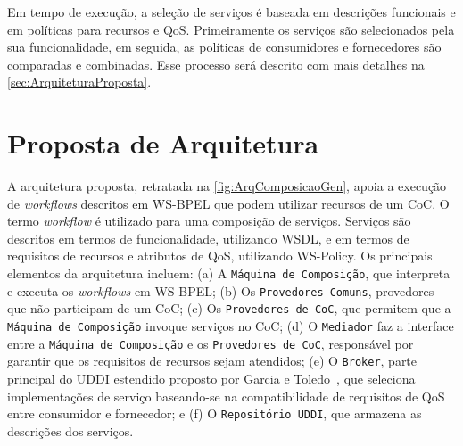 \documentclass[12pt]{report} %
\begin{document}
	
 	    

	Em tempo de execução, a seleção de serviços é baseada em descrições funcionais e em políticas para recursos e QoS.
	Primeiramente os serviços são selecionados pela sua funcionalidade, em seguida, as políticas de consumidores e fornecedores são comparadas e combinadas.
	Esse processo será descrito com mais detalhes na \autoref{sec:ArquiteturaProposta}.
	

    \section{Proposta de Arquitetura}
    \label{sec:ArquiteturaProposta}    

	A arquitetura proposta, retratada na \autoref{fig:ArqComposicaoGen}, apoia a execução de \textit{workflows} descritos em WS-BPEL que podem utilizar recursos de um CoC.
	O termo \textit{workflow} é utilizado para uma composição de serviços.
	Serviços são descritos em termos de funcionalidade, utilizando WSDL, e em termos de requisitos de recursos e atributos de QoS, utilizando WS-Policy.
	Os principais elementos da arquitetura incluem:
	(a) A \texttt{Máquina de Composição}, que interpreta e executa os \textit{workflows} em WS-BPEL;
	(b) Os \texttt{Provedores Comuns}, provedores que não participam de um  CoC;
	(c) Os \texttt{Provedores de CoC}, que permitem que a \texttt{Máquina de Composição} invoque serviços no CoC;
	(d) O \texttt{Mediador} faz a interface entre a \texttt{Máquina de Composição} e os \texttt{Provedores de CoC}, responsável por garantir que os requisitos de recursos sejam atendidos;
	(e) O \texttt{Broker}, parte principal do UDDI estendido proposto por Garcia e Toledo~\cite{DiegoUDDI}, que seleciona implementações de serviço baseando-se na compatibilidade de requisitos de QoS entre consumidor e fornecedor; e
	(f) O \texttt{Repositório UDDI}, que armazena as descrições dos serviços.
	
\end{document}
